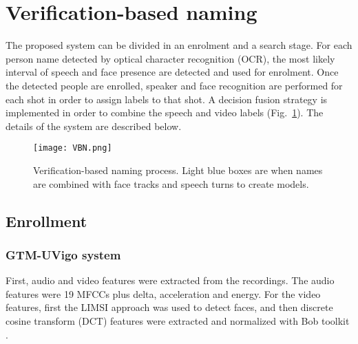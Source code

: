 \section{Verification-based naming}
\label{sec:verification}


The proposed system can be divided in an enrolment and a search stage. For each person name detected by optical character recognition (OCR), the most likely interval
of speech and face presence are detected and used for enrolment.
Once the detected people are enrolled, speaker and face recognition
are performed for each shot in order to assign labels to that shot. 
A decision fusion strategy is implemented in order to combine the speech and video labels (Fig.~\ref{fig:vbn}). The details of the system
are described below.

\begin{figure}[!htb]
 \centering
 \texttt{[image: VBN.png]}
\vspace*{-5mm}
 \caption{Verification-based naming process. Light blue boxes are when names are combined with face tracks and speech turns to create  models.}
\vspace*{-5mm}
 \label{fig:vbn}
\end{figure}

\subsection{Enrollment}

\subsubsection{GTM-UVigo system}
First, audio and video features were extracted from the recordings. The audio features were 19 MFCCs plus delta, acceleration and energy. For the video features, first
the LIMSI approach was used to detect faces, and then discrete cosine transform (DCT) features were extracted and normalized with Bob toolkit \cite{bob2012}.

